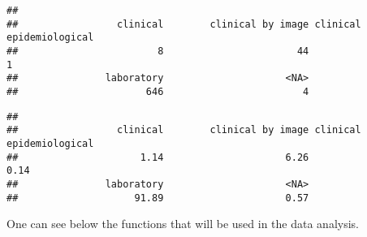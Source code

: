 \documentclass[
]{article}
\newenvironment{Shaded}{\begin{snugshade}}{\end{snugshade}}
\newcommand{\AttributeTok}[1]{\textcolor[rgb]{0.13,0.29,0.53}{#1}}
\newcommand{\DecValTok}[1]{\textcolor[rgb]{0.00,0.00,0.81}{#1}}
\newcommand{\FunctionTok}[1]{\textcolor[rgb]{0.13,0.29,0.53}{\textbf{#1}}}
\newcommand{\NormalTok}[1]{#1}
\newcommand{\OtherTok}[1]{\textcolor[rgb]{0.56,0.35,0.01}{#1}}
\newcommand{\SpecialCharTok}[1]{\textcolor[rgb]{0.81,0.36,0.00}{\textbf{#1}}}
\newcommand{\StringTok}[1]{\textcolor[rgb]{0.31,0.60,0.02}{#1}}
\begin{document}
\begin{Shaded}
\end{Shaded}

\begin{verbatim}
## 
##                 clinical        clinical by image clinical epidemiological 
##                        8                       44                        1 
##               laboratory                     <NA> 
##                      646                        4
\end{verbatim}

\begin{Shaded}
\end{Shaded}

\begin{verbatim}
## 
##                 clinical        clinical by image clinical epidemiological 
##                     1.14                     6.26                     0.14 
##               laboratory                     <NA> 
##                    91.89                     0.57
\end{verbatim}

One can see below the functions that will be used in the data analysis.
\end{document}
